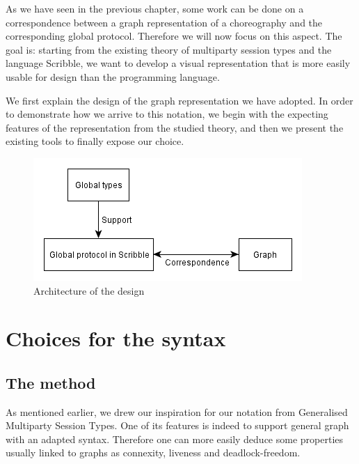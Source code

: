 \documentclass[a4paper,11pt,twoside]{report}
\begin{document}
As we have seen in the previous chapter, some work can be done on a correspondence between a graph representation of a choreography and the corresponding global protocol. Therefore we will now focus on this aspect. The goal is: starting from the existing theory of multiparty session types and the language Scribble, we want to develop a visual representation that is more easily usable for design than the programming language.

We first explain the design of the graph representation we have adopted. In order to demonstrate how we arrive to this notation, we begin with the expecting features of the representation from the studied theory, and then we present the existing tools to finally expose our choice.
\begin{figure}[h]
\begin{center}
\includegraphics{architecture}
\end{center}
\caption{Architecture of the design}\label{fig:archi}
\end{figure}

\section{Choices for the syntax}


\subsection{The method}
As mentioned earlier, we  drew our inspiration for our notation from Generalised Multiparty Session Types. One of its features is indeed to support general graph with an adapted syntax. Therefore one can more easily deduce some properties usually linked to graphs as connexity, liveness and deadlock-freedom.
\end{document}
